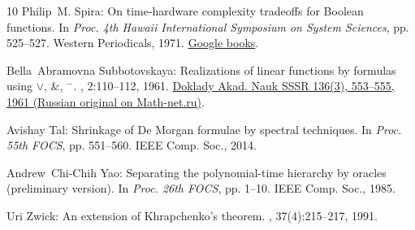 \documentclass[11pt]{article}
\numberwithin{equation}{section}
\theoremstyle{definition}
\theoremstyle{plain}
\theoremstyle{definition}\newtheorem{notation}[theorem]{Notation}\theoremstyle{plain}
\begin{document}
\begin{thebibliography}{10}
{\sc Philip~M. Spira}: On time-hardware complexity tradeoffs for {B}oolean
  functions.
\newblock In {\em Proc. 4th Hawaii International Symposium on System Sciences},
  pp. 525--527. Western Periodicals, 1971.
\newblock
  \href{https://books.google.com/books/about/Proceedings_Fourth_Hawaii_International.html?id=Y0zVjwEACAAJ}{Google
  books}.

{\sc Bella~Abramovna Subbotovskaya}: Realizations of linear functions by
  formulas using $\vee$, $\&$, $^-$.
, 2:110--112, 1961.
\newblock \href{https://mi.mathnet.ru/dan24539}{Doklady Akad. Nauk SSSR 136(3),
  553--555, 1961 (Russian original on Math-net.ru)}.

{\sc Avishay Tal}: Shrinkage of {D}e {M}organ formulae by spectral techniques.
\newblock In {\em Proc. 55th FOCS}, pp. 551--560. IEEE Comp. Soc., 2014.

{\sc Andrew~Chi{-}Chih Yao}: Separating the polynomial-time hierarchy by
  oracles (preliminary version).
\newblock In {\em Proc. 26th FOCS}, pp. 1--10. IEEE Comp. Soc., 1985.

{\sc Uri Zwick}: An extension of {Khrapchenko}'s theorem.
, 37(4):215--217, 1991.
\newblock [\epfmtdoi{10.1016/0020-0190(91)90191-J}]

\end{thebibliography}
\end{document}

